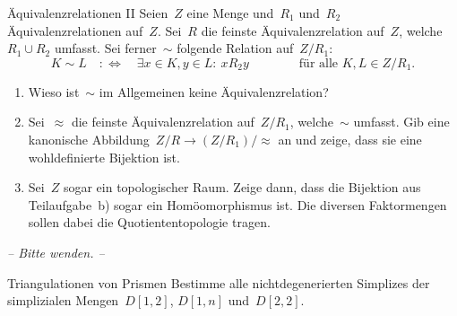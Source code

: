 \documentclass{uebblatt}
\begin{document}
\begin{aufgabe}{Äquivalenzrelationen II}
Seien~$Z$ eine Menge und~$R_1$ und~$R_2$ Äquivalenzrelationen auf~$Z$.
Sei~$R$ die feinste Äquivalenzrelation auf~$Z$, welche~$R_1 \cup R_2$ umfasst.
Sei ferner~$\sim$ folgende Relation auf~$Z/R_1$:
\[ K \sim L \quad:\Longleftrightarrow\quad
  \exists x \in K, y \in L{:}\ x R_2 y \qquad\qquad\text{für alle~$K,L \in
  Z/R_1$.} \]

\begin{enumerate}
\item Wieso ist~$\sim$ im Allgemeinen keine Äquivalenzrelation?
\item Sei~$\approx$ die feinste Äquivalenzrelation auf~$Z/R_1$, welche~$\sim$
umfasst. Gib eine kanonische Abbildung~$Z/R \to (Z/R_1)/{\approx}$ an und zeige,
dass sie eine wohldefinierte Bijektion ist.
\item Sei~$Z$ sogar ein topologischer Raum. Zeige dann, dass die Bijektion aus
Teilaufgabe~b) sogar ein Homöomorphismus ist. Die diversen Faktormengen
sollen dabei die Quotiententopologie tragen.
\end{enumerate}
\end{aufgabe}

\begin{center}\emph{-- Bitte wenden. --}\end{center}

\begin{aufgabe}{Triangulationen von Prismen}
Bestimme alle nichtdegenerierten Simplizes der simplizialen Mengen~$D[1,2]$,
$D[1,n]$ und~$D[2,2]$.
\end{aufgabe}
\end{document}
